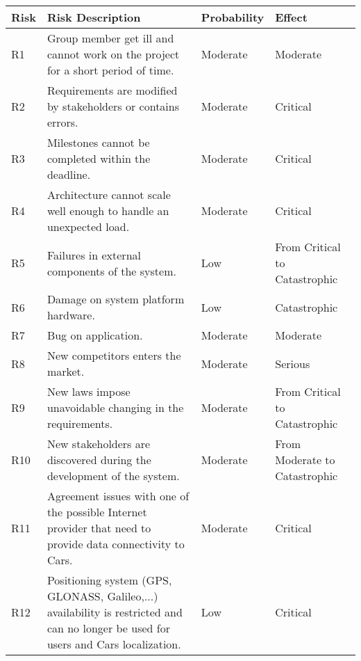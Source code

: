 \begin{tabular}{| l | p{7cm}  | l |  p{2.8cm} |}
\hline
\textbf{Risk} & \textbf{Risk Description} & \textbf{Probability} & \textbf{Effect}\\
\hline
R1 & Group member get ill and cannot work on the project for a short period of time. & Moderate & Moderate\\
\hline
R2 & Requirements are modified by stakeholders or contains errors. & Moderate & Critical\\
\hline
R3 & Milestones cannot be completed within the deadline. & Moderate & Critical\\
\hline
R4 & Architecture cannot scale well enough to handle an unexpected load. & Moderate & Critical\\
\hline
R5 & Failures in external components of the system. & Low & From Critical to Catastrophic\\
\hline
R6 & Damage on system platform hardware. & Low & Catastrophic\\
\hline
R7 & Bug on application. & Moderate & Moderate\\
\hline
R8 & New competitors enters the market. & Moderate & Serious\\
\hline
R9 & New laws impose unavoidable changing in the requirements. & Moderate & From Critical to Catastrophic\\
\hline
R10 & New stakeholders are discovered during the development of the system. & Moderate & From Moderate to Catastrophic\\
\hline
R11 & Agreement issues with one of the possible Internet provider that need to provide data connectivity to Cars. & Moderate & Critical\\
\hline
R12 & Positioning system (GPS, GLONASS, Galileo,...) availability is restricted and can no longer be used for users and Cars localization. & Low & Critical\\
\hline
\end{tabular}

\bigskip

